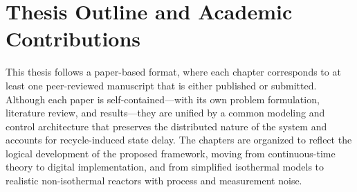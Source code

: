 \section{Thesis Outline and Academic Contributions}

This thesis follows a paper-based format, where each chapter corresponds to at least one peer-reviewed manuscript that is either published or submitted. Although each paper is self-contained—with its own problem formulation, literature review, and results—they are unified by a common modeling and control architecture that preserves the distributed nature of the system and accounts for recycle-induced state delay. The chapters are organized to reflect the logical development of the proposed framework, moving from continuous-time theory to digital implementation, and from simplified isothermal models to realistic non-isothermal reactors with process and measurement noise.

